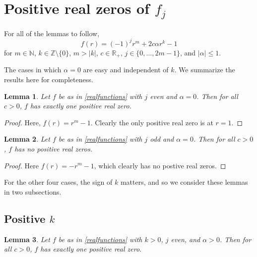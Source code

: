 \documentclass{amsart}
\newtheorem{lemma}{Lemma}
\theoremstyle{definition}
\theoremstyle{remark}
\begin{document}
\section{Positive real zeros of $f_j$}

For all of the lemmas to follow, 
\begin{equation}\label{realfunctions}
    f(r) = (-1)^j r^m +2 c \alpha r^k - 1
\end{equation}
for $m \in \mathbb{N}$, $k \in \mathbb{Z} \setminus \{0\}$, $m>|k|$, $c \in \mathbb{R}_+$, $j \in \{0,\ldots, 2m-1\}$, and $|\alpha| \leq 1$. 

The cases in which $\alpha = 0$ are easy and independent of $k$. We summarize the results here for completeness. 

\begin{lemma}\label{degposlemma}
Let $f$ be as in \eqref{realfunctions} with $j$ even and $\alpha =0$. Then for all $c>0$, $f$ has exactly one positive real zero. 
\end{lemma}

\begin{proof}
Here, $f(r) = r^m - 1$. Clearly the only positive real zero is at $r=1$. 
\end{proof}

\begin{lemma}\label{degneglemma}
Let $f$ be as in \eqref{realfunctions} with $j$ odd and $\alpha = 0$. Then for all $c>0$, $f$ has no positive real zeros. 
\end{lemma}

\begin{proof}
Here $f(r) = -r^m -1$, which clearly has no postive real zeros. 
\end{proof}

For the other four cases, the sign of $k$ matters, and so we consider these lemmas in two subsections. 

\subsection{Positive $k$}

\begin{lemma}\label{kadenlemma}
Let $f$ be as in \eqref{realfunctions} with $k>0$, $j$ even, and $\alpha >0$. Then for all $c>0$, $f$ has exactly one positive real zero. 
\end{lemma}
\end{document}
